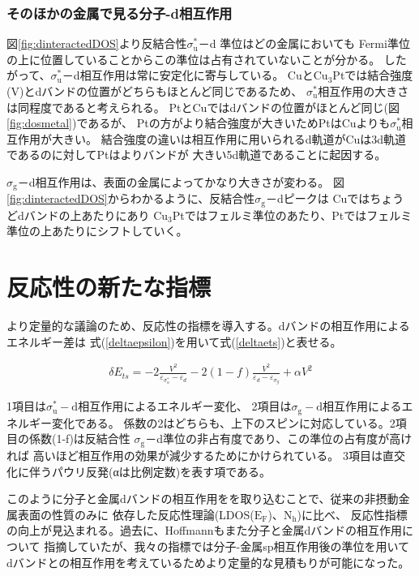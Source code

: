 \documentclass[12pt]{ltjsarticle}
\begin{document}
\subsubsection{そのほかの金属で見る分子-d相互作用}
図\ref{fig:dinteractedDOS}より反結合性$\sigma _\text{u} ^* $－d 準位はどの金属においても
Fermi準位の上に位置していることからこの準位は占有されていないことが分かる。
したがって、$ \sigma _\text{u} ^*$－d相互作用は常に安定化に寄与している。
Cuと$\text{Cu}_\text{3}$Ptでは結合強度(V)とdバンドの位置がどちらもほとんど同じであるため、
$ \sigma _\text{u}^*$相互作用の大きさは同程度であると考えられる。
PtとCuではdバンドの位置がほとんど同じ(図\ref{fig:dosmetal})であるが、
Ptの方がより結合強度が大きいためPtはCuよりも$ \sigma _\text{u}^*$相互作用が大きい。
結合強度の違いは相互作用に用いられるd軌道がCuは3d軌道であるのに対してPtはよりバンドが
大きい5d軌道であることに起因する。

$\sigma _\text{g}$－d相互作用は、表面の金属によってかなり大きさが変わる。
図\ref{fig:dinteractedDOS}からわかるように、反結合性$\sigma _\text{g}$－dピークは
Cuではちょうどdバンドの上あたりにあり
$\text{Cu}_\text{3}$Ptではフェルミ準位のあたり、Ptではフェルミ準位の上あたりにシフトしていく。

\section{反応性の新たな指標}
より定量的な議論のため、反応性の指標を導入する。dバンドの相互作用によるエネルギー差は
式(\ref{deltaepsilon})を用いて式(\ref{deltaets})と表せる。

\begin{eqnarray}
    \label{deltaets}
    \delta E_{ts} = -2 \frac{ V^2 }{\varepsilon _{\sigma_u^*} - \varepsilon _d}
                    -2(1-f)\frac{V^2}{\varepsilon _d - \varepsilon _{\sigma_g}}
                    + \alpha V^2
\end{eqnarray}

1項目は$\sigma _\text{u}^* -\text{d}$相互作用によるエネルギー変化、
2項目は$\sigma _\text{g}-\text{d}$相互作用によるエネルギー変化である。
係数の2はどちらも、上下のスピンに対応している。2項目の係数(1-f)は反結合性
$\sigma_\text{g}$－d準位の非占有度であり、この準位の占有度が高ければ
高いほど相互作用の効果が減少するためにかけられている。
3項目は直交化に伴うパウリ反発(αは比例定数)を表す項である。

このように分子と金属dバンドの相互作用をを取り込むことで、従来の非摂動金属表面の性質のみに
依存した反応性理論(LDOS($\text{E}_\text{F}$)、$\text{N}_\text{h}$)に比べ、
反応性指標の向上が見込まれる。過去に、Hoffmannもまた分子と金属dバンドの相互作用について
指摘していた\cite{Hoffman1988}が、我々の指標では分子-金属sp相互作用後の準位を用いて
dバンドとの相互作用を考えているためより定量的な見積もりが可能になった。
\end{document}

